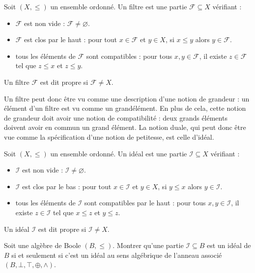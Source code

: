 \begin{definition}[Filtre]
  Soit $(X,\leq)$ un ensemble ordonné. Un filtre est une partie
  $\mathcal F\subseteq X$ vérifiant :
  \begin{itemize}
  \item $\mathcal F$ est non vide : $\mathcal F \neq\varnothing$.
  \item $\mathcal F$ est clos par le haut : pour tout $x\in \mathcal F$ et
    $y\in X$, si $x\leq y$ alors $y\in \mathcal F$.
  \item tous les éléments de $\mathcal F$ sont compatibles : pour tous
    $x,y\in\mathcal F$, il existe $z\in\mathcal F$ tel que $z\leq x$ et
    $z\leq y$.
  \end{itemize}

  Un filtre $\mathcal F$ est dit propre si $\mathcal F \neq X$.
\end{definition}

Un filtre peut donc être vu comme une description d'une notion de grandeur :
un élément d'un filtre est vu comme un \og grand\fg élément. En plus de cela,
cette notion de grandeur doit avoir une notion de compatibilité : deux grands
éléments doivent avoir en commun un grand élément. La notion duale, qui peut donc
être vue comme la spécification d'une notion de petitesse, est celle d'idéal.

\begin{definition}[Idéal]
  Soit $(X,\leq)$ un ensemble ordonné. Un idéal est une partie
  $\mathcal I \subseteq X$ vérifiant :
  \begin{itemize}
  \item $\mathcal I$ est non vide : $\mathcal I \neq\varnothing$.
  \item $\mathcal I$ est clos par le bas : pour tout $x\in \mathcal I$ et
    $y\in X$, si $y\leq x$ alors $y\in \mathcal I$.
  \item tous les éléments de $\mathcal I$ sont compatibles par le haut :
    pour tous $x,y\in \mathcal I$, il existe $z\in \mathcal I$ tel que
    $x\leq z$ et $y\leq z$.
  \end{itemize}

  Un idéal $\mathcal I$ est dit propre si $\mathcal I \neq X$.
\end{definition}

\begin{definition}
  Soit une algèbre de Boole $(B,\leq)$. Montrer qu'une partie
  $\mathcal I \subseteq B$ est un idéal de $B$ si et seulement si c'est un idéal
  au sens algébrique de l'anneau associé $(B,\bot,\top,\oplus,\land)$.
\end{definition}

